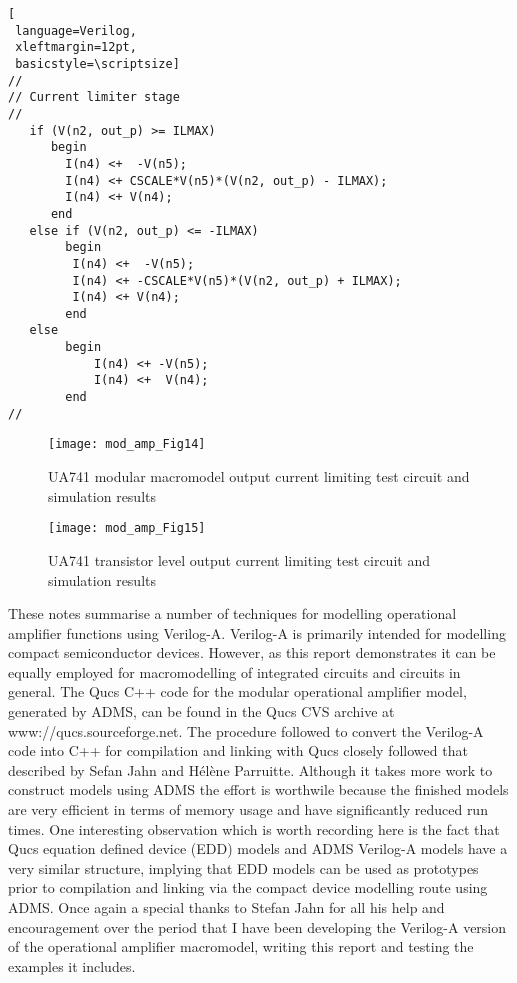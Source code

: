 \begin{lstlisting}[
 language=Verilog, 
 xleftmargin=12pt,
 basicstyle=\scriptsize]
//
// Current limiter stage
//
   if (V(n2, out_p) >= ILMAX) 
      begin
        I(n4) <+  -V(n5);
        I(n4) <+ CSCALE*V(n5)*(V(n2, out_p) - ILMAX);
        I(n4) <+ V(n4);
      end
   else if (V(n2, out_p) <= -ILMAX)
        begin
         I(n4) <+  -V(n5);
         I(n4) <+ -CSCALE*V(n5)*(V(n2, out_p) + ILMAX);
         I(n4) <+ V(n4);
        end
   else
        begin
            I(n4) <+ -V(n5);
            I(n4) <+  V(n4);
        end
//
\end{lstlisting}

\begin{figure} [here]
  \centering
  \texttt{[image: mod\_amp\_Fig14]}
  \caption{UA741 modular macromodel output current limiting test circuit and simulation results}
  \label{fig:mod_amp14}
\end{figure} 


\begin{figure} [here]
  \centering
  \texttt{[image: mod\_amp\_Fig15]}
  \caption{UA741 transistor level output current limiting test circuit and simulation results}
  \label{fig:mod_amp15}
\end{figure} 



These notes summarise a number of techniques for modelling operational
amplifier functions using Verilog-A.  Verilog-A is primarily intended
for modelling compact semiconductor devices.  However, as this report
demonstrates it can be equally employed for macromodelling of
integrated circuits and circuits in general. The Qucs C++ code for the
modular operational amplifier model, generated by ADMS, can be found
in the Qucs CVS archive at www://qucs.sourceforge.net.  The procedure
followed to convert the Verilog-A code into C++ for compilation and
linking with Qucs closely followed that described by Sefan Jahn and
H\'{e}l\`{e}ne Parruitte.  Although it takes more work to construct
models using ADMS the effort is worthwile because the finished models
are very efficient in terms of memory usage and have significantly
reduced run times. One interesting observation which is worth
recording here is the fact that Qucs equation defined device (EDD)
models and ADMS Verilog-A models have a very similar structure,
implying that EDD models can be used as prototypes prior to
compilation and linking via the compact device modelling route using
ADMS. Once again a special thanks to Stefan Jahn for all his help and
encouragement over the period that I have been developing the
Verilog-A version of the operational amplifier macromodel, writing
this report and testing the examples it includes.
